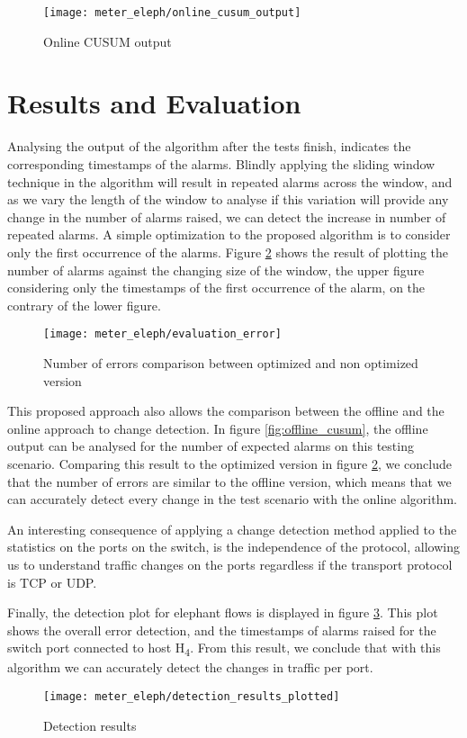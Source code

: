 \begin{figure} [H]
    \centering
    \texttt{[image: meter\_eleph/online\_cusum\_output]}
    \caption {Online CUSUM output}
    \label{fig:online_cusum}
\end{figure} 

\section {Results and Evaluation} \label{sec:change_results}

Analysing the output of the algorithm after the tests finish, indicates the corresponding timestamps of the alarms. Blindly applying the sliding window technique
in the algorithm will result in repeated alarms across the window, and as we vary the length of the window to analyse if this variation will provide any change in the
number of alarms raised, we can detect the increase in number of repeated alarms. A simple optimization to the proposed algorithm is to consider only the first
occurrence of the alarms. Figure \ref{fig:errors_comparaison} shows the result of plotting the number of alarms against the changing size of the window, the
upper figure considering only the timestamps of the first occurrence of the alarm, on the contrary of the lower figure.

\begin{figure} [H]
    \centering
    \texttt{[image: meter\_eleph/evaluation\_error]}
    \caption {Number of errors comparison between optimized and non optimized version}
    \label{fig:errors_comparaison}
\end{figure} 

\par This proposed approach also allows the comparison between the offline and the online approach to change detection. In figure \ref{fig:offline_cusum}, the 
offline output can be analysed for the number of expected alarms on this testing scenario. Comparing this result to the optimized version in figure 
\ref{fig:errors_comparaison}, we conclude that the number of errors are similar to the offline version, which means that we can accurately detect every change in
the test scenario with the online algorithm.

\par An interesting consequence of applying a change detection method applied to the statistics on the ports on the switch, is the independence of the protocol,
allowing us to understand traffic changes on the ports regardless if the transport protocol is TCP or UDP.

\par Finally, the detection plot for elephant flows is displayed in figure \ref{fig:color_plot}. This plot shows the overall error detection, and the timestamps
of alarms raised for the switch port connected to host H\textsubscript{4}. From this result, we conclude that with this algorithm we can accurately detect the 
changes in traffic per port.

\begin{figure}
    \centering
    \texttt{[image: meter\_eleph/detection\_results\_plotted]}
    \caption{Detection results}
    \label{fig:color_plot}
\end{figure}
